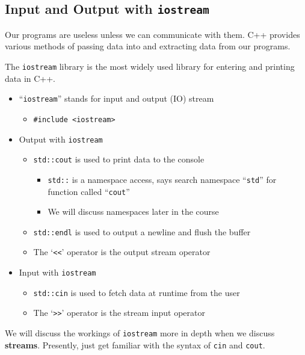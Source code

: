 \documentclass{article}
\begin{document}
\subsection{Input and Output with \texttt{iostream}}

\noindent
Our programs are useless unless we can communicate with them. C++ provides various methods of passing data into and extracting data from our programs.

\noindent
The \texttt{iostream} library is the most widely used library for entering and printing data in C++.

\begin{itemize}
	\item ``\texttt{iostream}'' stands for input and output (IO) stream
	\begin{itemize}
		\item \texttt{\#include <iostream>}
	\end{itemize}
	\item Output with \texttt{iostream}
	\begin{itemize}
		\item \texttt{std::cout} is used to print data to the console
		\begin{itemize}
			\item \texttt{std::} is a namespace access, says search namespace ``\texttt{std}'' for function called ``\texttt{cout}''
			\item We will discuss namespaces later in the course
		\end{itemize}
		\item \texttt{std::endl} is used to output a newline and flush the buffer
		\item The `\texttt{<<}' operator is the output stream operator
	\end{itemize}
	\item Input with \texttt{iostream}
	\begin{itemize}
		\item \texttt{std::cin} is used to fetch data at runtime from the user
		\item The `\texttt{>>}' operator is the stream input operator
	\end{itemize}
\end{itemize}

\noindent
We will discuss the workings of \texttt{iostream} more in depth when we discuss \textbf{streams}. Presently, just get familiar with the syntax of \texttt{cin} and \texttt{cout}.


\end{document}
